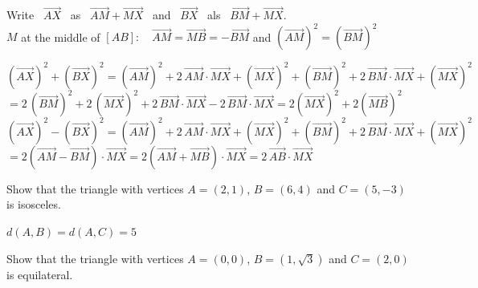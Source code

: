 \begin{Answer}\phantom{}
    Write \ $\overrightarrow{AX}$ \ as \ $\overrightarrow{AM} + \overrightarrow{MX}$ \ and \ $\overrightarrow{BX}$ \ als \ $\overrightarrow{BM} + \overrightarrow{MX}$. \\
    $M$ at the middle of $[AB]: \quad \overrightarrow{AM} = \overrightarrow{MB} = -\overrightarrow{BM} $ \; and \;  $\left(\overrightarrow{AM}\right)^2 = \left(\overrightarrow{BM}\right)^2$
    
	    \Question $\left(\overrightarrow{AX}\right)^2+\left(\overrightarrow{BX}\right)^2 = \left(\overrightarrow{AM}\right)^2 + 2\, \overrightarrow{AM} \cdot \overrightarrow{MX} + \left(\overrightarrow{MX}\right)^2 + \left(\overrightarrow{BM}\right)^2 + 2\, \overrightarrow{BM} \cdot \overrightarrow{MX} + \left(\overrightarrow{MX}\right)^2 $ \\
	    $= 2\, \left(\overrightarrow{BM}\right)^2 + 2\, \left(\overrightarrow{MX}\right)^2 + 2 \, \overrightarrow{BM} \cdot \overrightarrow{MX} - 2\, \overrightarrow{BM} \cdot \overrightarrow{MX} 
	    =2\left(\overrightarrow{MX}\right)^2+2\left(\overrightarrow{MB}\right)^2$
		\Question $\left(\overrightarrow{AX}\right)^2-\left(\overrightarrow{BX}\right)^2 = \left(\overrightarrow{AM}\right)^2 + 2\, \overrightarrow{AM} \cdot \overrightarrow{MX} + \left(\overrightarrow{MX}\right)^2 + \left(\overrightarrow{BM}\right)^2 + 2\, \overrightarrow{BM} \cdot \overrightarrow{MX} + \left(\overrightarrow{MX}\right)^2 $ \\
		$= 2 \left(\overrightarrow{AM} - \overrightarrow{BM} \right) \cdot \overrightarrow{MX} = 2 \left(\overrightarrow{AM} + \overrightarrow{MB} \right) \cdot \overrightarrow{MX}=2\,\overrightarrow{AB}\cdot \overrightarrow{MX}$
    
\end{Answer}
	
\begin{Exercise}[difficulty = 1] Show that the triangle with vertices $A=(2,1)$, $B=(6,4)$ and $C=(5,-3)$ is isosceles.

\end{Exercise}

\begin{Answer}\phantom{}
    $d(A,B) = d(A,C) = 5$
\end{Answer}
	
\begin{Exercise}[difficulty = 1] Show that the triangle with vertices  $A=(0,0)$, $B=\left(1,\sqrt{3}\right)$ and $C=(2,0)$ is equilateral.

\end{Exercise}

